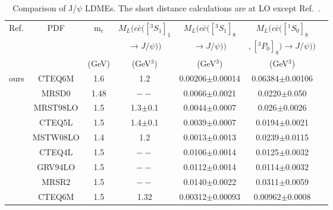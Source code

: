 \documentclass[12pt,a4paper,final]{iopart}
\newcommand{\barc}{{\bar{c}}}
\begin{document}
\begin{table}[h]
\caption{Comparison of J/$\psi$ LDMEs. The short distance calculations are at LO except Ref.~\cite{Butenschoen:2010rq}.}
\begin{tabular}{|l|c|c|c|c|c|c|}
\hline            
Ref.       &PDF     &m$_{c}$  &$M_{L}(c\barc([^3S_1]_{1}$      &$M_{L}(c\barc([^3S_1]_{8}$    &$M_{L}(c\barc([^1S_0]_{8}$ \\
           &        &        &$\rightarrow J/\psi))$      &$\rightarrow J/\psi))$    &$,[^3P_0]_{8})\rightarrow J/\psi))$   \\
          &        &(GeV)   &(GeV$^{3}$)            &(GeV$^{3}$)   &(GeV$^{3}$)                                  \\
\hline
ours                           &CTEQ6M   &1.6     &1.2            &0.00206$\pm$0.00014  &0.06384$\pm$0.00106                           \\
\cite{Cho:1995vh}              &MRSD0    &1.48    &$--$           &0.0066$\pm$0.0021    &0.0220$\pm$0.050                                 \\
\cite{Braaten:1999qk}          &MRST98LO &1.5     &1.3$\pm$0.1    &0.0044$\pm$0.0007    &0.026$\pm$0.0026                                \\
\cite{Braaten:1999qk}          &CTEQ5L   &1.5     &1.4$\pm$0.1    &0.0039$\pm$0.0007    &0.0194$\pm$0.0021                                \\
\cite{Sharma:2012dy}           &MSTW08LO &1.4      &1.2            &0.0013$\pm$0.0013    &0.0239$\pm$0.0115                                \\
\cite{Beneke:1996yw}            &CTEQ4L   &1.5     &$--$           &0.0106$\pm$0.0014   &0.0125$\pm$0.0032                                \\
\cite{Beneke:1996yw}            &GRV94LO  &1.5     &$--$           &0.0112$\pm$0.0014   &0.0114$\pm$0.0032                                \\
\cite{Beneke:1996yw}            &MRSR2    &1.5     &$--$           &0.0140$\pm$0.0022   &0.0311$\pm$0.0059                                \\
\cite{Butenschoen:2010rq}      &CTEQ6M   &1.5     &1.32           &0.00312$\pm$0.00093 &0.00962$\pm$0.0008                              \\
\hline
\end{tabular}
\label{table:LDMEJPsi}
\end{table}
\end{document}
